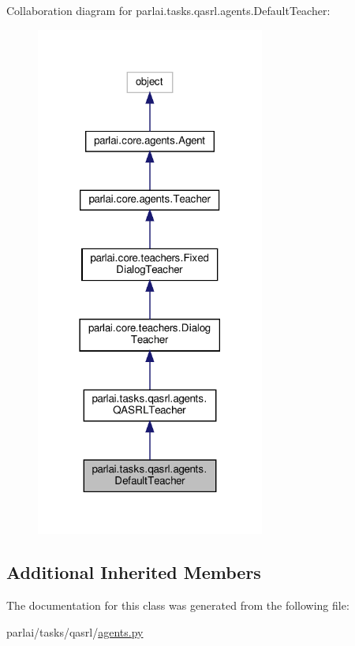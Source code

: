 Collaboration diagram for parlai.\+tasks.\+qasrl.\+agents.\+Default\+Teacher\+:
\nopagebreak
\begin{figure}[H]
\begin{center}
\leavevmode
\includegraphics[width=213pt]{classparlai_1_1tasks_1_1qasrl_1_1agents_1_1DefaultTeacher__coll__graph}
\end{center}
\end{figure}
\subsection*{Additional Inherited Members}


The documentation for this class was generated from the following file\+:\begin{DoxyCompactItemize}
\item 
parlai/tasks/qasrl/\hyperlink{parlai_2tasks_2qasrl_2agents_8py}{agents.\+py}\end{DoxyCompactItemize}
